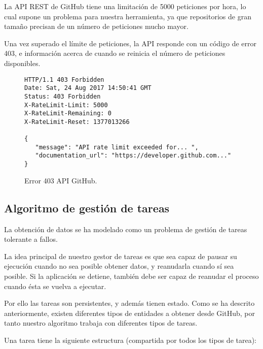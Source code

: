 La API REST de GitHub tiene una limitación de 5000 peticiones por hora, lo cual supone un problema para nuestra herramienta, ya que repositorios de gran tamaño precisan de un número de peticiones mucho mayor.

Una vez superado el límite de peticiones, la API responde con un código de error 403, e información acerca de cuando se reinicia el número de peticiones disponibles.

\begin{figure}[H]
\begin{verbatim}
HTTP/1.1 403 Forbidden
Date: Sat, 24 Aug 2017 14:50:41 GMT
Status: 403 Forbidden
X-RateLimit-Limit: 5000
X-RateLimit-Remaining: 0
X-RateLimit-Reset: 1377013266

{
   "message": "API rate limit exceeded for... ",
   "documentation_url": "https://developer.github.com..."
}
\end{verbatim}
\caption{Error 403 API GitHub.} 
\label{error-403}
\end{figure}

\subsection{Algoritmo de gestión de tareas}

La obtención de datos se ha modelado como un problema de gestión de tareas tolerante a fallos.

La idea principal de nuestro gestor de tareas es que sea capaz de pausar su ejecución cuando no sea posible obtener datos, y reanudarla cuando sí sea posible. Si la aplicación se detiene, también debe ser capaz de reanudar el proceso cuando ésta se vuelva a ejecutar.

Por ello las tareas son persistentes, y además tienen estado. Como se ha descrito anteriormente, existen diferentes tipos de entidades a obtener desde GitHub, por tanto nuestro algoritmo trabaja con diferentes tipos de tareas.

Una tarea tiene la siguiente estructura (compartida por todos los tipos de tarea):

